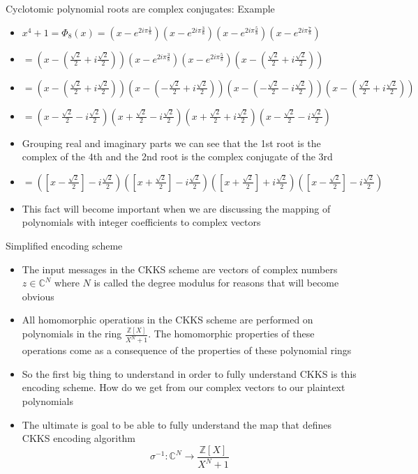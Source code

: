 \documentclass{beamer}
\begin{document}
\begin{frame}{Cyclotomic polynomial roots are complex conjugates: Example}
	\begin{itemize}[<+->]
		\item $x^4 + 1 = \Phi_8(x) = (x - e^{2i \pi \frac{1}{8}})(x - e^{2i \pi \frac{3}{8}})(x - e^{2i \pi \frac{5}{8}})(x - e^{2i \pi \frac{7}{8}})$
		\item $ = (x - (\frac{\sqrt{2}}{2} + i\frac{\sqrt{2}}{2}))(x - e^{2i \pi \frac{3}{8}})(x - e^{2i \pi \frac{5}{8}})(x - (\frac{\sqrt{2}}{2} + i\frac{\sqrt{2}}{2}))$
		\item $ = (x - (\frac{\sqrt{2}}{2} + i\frac{\sqrt{2}}{2}))(x - (-\frac{\sqrt{2}}{2} + i\frac{\sqrt{2}}{2}))(x - (-\frac{\sqrt{2}}{2} - i\frac{\sqrt{2}}{2}))(x - (\frac{\sqrt{2}}{2} + i\frac{\sqrt{2}}{2}))$
		\item $ = (x -\frac{\sqrt{2}}{2} - i\frac{\sqrt{2}}{2})(x +\frac{\sqrt{2}}{2} - i\frac{\sqrt{2}}{2})(x +\frac{\sqrt{2}}{2} + i\frac{\sqrt{2}}{2})(x -\frac{\sqrt{2}}{2} - i\frac{\sqrt{2}}{2})$
		\item Grouping real and imaginary parts we can see that the 1st root is the complex of the 4th 
		and the 2nd root is the complex conjugate of the 3rd
		\item $= ([x -\frac{\sqrt{2}}{2}] - i\frac{\sqrt{2}}{2})([x +\frac{\sqrt{2}}{2}] - i\frac{\sqrt{2}}{2})([x +\frac{\sqrt{2}}{2}] + i\frac{\sqrt{2}}{2})([x -\frac{\sqrt{2}}{2}] - i\frac{\sqrt{2}}{2})$
		\item This fact will become important when we are discussing the mapping of polynomials with integer
		coefficients to complex vectors
	\end{itemize}
\end{frame}

\begin{frame}{Simplified encoding scheme}
	\begin{itemize}[<+->]
		\item The input messages in the CKKS scheme are vectors of complex numbers $z \in \mathbb{C}^N$
		where $N$ is called the degree modulus for reasons that will become obvious
		\item All homomorphic operations in the CKKS scheme are performed on polynomials in the ring
		$\frac{\mathbb{Z}[X]}{X^N + 1}$. The homomorphic properties of these operations come as a consequence
		of the properties of these polynomial rings
		\item So the first big thing to understand in order to fully understand CKKS is this encoding
		scheme. How do we get from our complex vectors to our plaintext polynomials
		\item The ultimate is goal to be able to fully understand the map that defines CKKS encoding algorithm
		$$\sigma^{-1} : \mathbb{C}^N \to \frac{\mathbb{Z}[X]}{X^N + 1}$$

	\end{itemize}
\end{frame}
\end{document}
